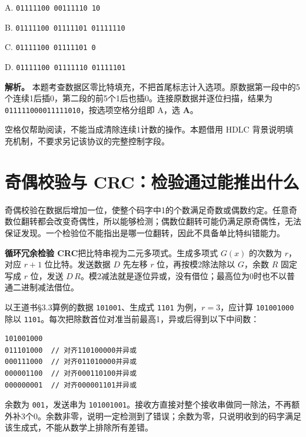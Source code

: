 A. \allowbreak{}\texttt{01111100\ 00111110\ 10}

B. \allowbreak{}\texttt{01111100\ 01111101\ 01111110}

C. \allowbreak{}\texttt{01111100\ 01111101\ 0}

D. \allowbreak{}\texttt{01111100\ 01111110\ 01111101}


\textbf{解析。} 本题考查数据区零比特填充，不把首尾标志计入选项。原数据第一段中的5个连续1后插0，第二段的前5个1后也插0。连接原数据并逐位扫描，结果为 \allowbreak{}\texttt{011111000011111010}，按选项空格分组即 A，选 \textbf{A}。

空格仅帮助阅读，不能当成清除连续1计数的操作。本题借用 HDLC 背景说明填充机制，不要求另记该协议的完整控制字段。

\section{奇偶校验与 CRC：检验通过能推出什么}\label{cn-03-03}

奇偶校验在数据后增加一位，使整个码字中1的个数满足奇数或偶数约定。任意奇数位翻转都会改变奇偶性，所以能够检测；偶数位翻转可能仍满足原奇偶性，无法保证发现。一个检验位不能指出是哪一位翻转，因此不具备单比特纠错能力。

\textbf{循环冗余检验 CRC}把比特串视为二元多项式。生成多项式 \(G(x)\) 的次数为 \(r\)，对应 \(r+1\) 位比特。发送数据 \(D\) 先左移 \(r\) 位，再按模2除法除以 \(G\)，余数 \(R\) 固定写成 \(r\) 位，发送 \(D\,R\)。模2减法就是逐位异或，没有借位；最高位为0时也不以普通二进制减法借位。

以王道书§3.3算例的数据 \allowbreak{}\texttt{101001}、生成式 \allowbreak{}\texttt{1101} 为例，\(r=3\)，应计算 \allowbreak{}\texttt{101001000} 除以 \allowbreak{}\texttt{1101}。每次把除数首位对准当前最高1，异或后得到以下中间数：

\par\medskip\noindent
\begin{minipage}{\linewidth}
\begin{verbatim}
101001000
011101000  // 对齐110100000并异或
000111000  // 对齐011010000并异或
000001100  // 对齐000110100并异或
000000001  // 对齐000001101并异或
\end{verbatim}
\end{minipage}\par\medskip

余数为 \allowbreak{}\texttt{001}，发送串为 \allowbreak{}\texttt{101001001}。接收方直接对整个接收串做同一除法，不再额外补3个0。余数非零，说明一定检测到了错误；余数为零，只说明收到的码字满足该生成式，不能从数学上排除所有差错。

